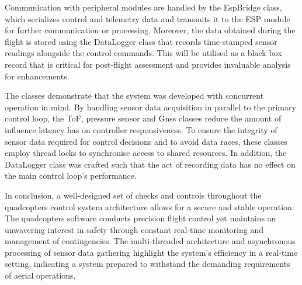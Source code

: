\documentclass{article}
\begin{document}
Communication with peripheral modules are handled by the EspBridge class, which
serializes control and telemetry data and transmits it to the ESP module for
further communication or processing. Moreover, the data obtained during the
flight is stored using the DataLogger class that records time-stamped sensor
readings alongside the control commands. This will be utilised as a black box
record that is critical for post-flight assessment and provides invaluable
analysis for enhancements.

The classes demonstrate that the system was developed with concurrent operation
in mind. By handling sensor data acquisition in parallel to the primary control
loop, the ToF, pressure sensor and Gnss classes reduce the amount of influence
latency has on controller responsiveness. To ensure the integrity of sensor data
required for control decisions and to avoid data races, these classes employ
thread locks to synchronise access to shared resources. In addition, the
DataLogger class was crafted such that the act of recording data has no effect
on the main control loop's performance.

In conclusion, a well-designed set of checks and controls throughout the
quadcopters control system architecture allows for a secure and stable
operation. The quadcopters software conducts precision flight control yet
maintains an unwavering interest in safety through constant real-time monitoring
and management of contingencies. The multi-threaded architecture and
asynchronous processing of sensor data gathering highlight the system's
efficiency in a real-time setting, indicating a system prepared to withstand the
demanding requirements of aerial operations.
\end{document}
